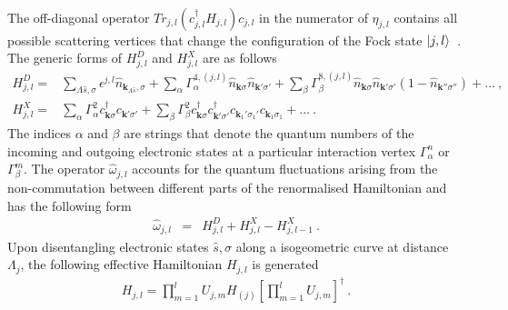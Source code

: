 \documentclass[reprint,onecolumn,prb,superscriptaddress]{revtex4-2}
\begin{document}
{\begin{eqnarray}
\end{eqnarray}
The off-diagonal operator \(Tr_{j,l}(c^{\dagger}_{j,l}H_{j,l})c_{j,l}\) in the numerator of \(\eta_{j,l}\) contains all possible scattering vertices that  change the configuration of the Fock state \(\ket{j,l}\)~\cite{anirbanurg1}. The generic forms of $H^{D}_{j,l}$ and $H^{X}_{j,l}$ are as follows
\begin{equation}\begin{aligned}
H^{D}_{j,l}=&\sum_{\Lambda\hat{s},\sigma}\epsilon^{j,l}\hat{n}_{\mathbf{k}_{\Lambda\hat{s}},\sigma}+\sum_{\alpha}\Gamma_{\alpha}^{4,(j,l)}\hat{n}_{\mathbf{k}\sigma}\hat{n}_{\mathbf{k}'\sigma'} +\sum_{\beta}\Gamma_{\beta}^{8,(j,l)}\hat{n}_{\mathbf{k}\sigma}\hat{n}_{\mathbf{k}'\sigma'}(1-\hat{n}_{\mathbf{k}''\sigma''})+\ldots~,\\
H^{X}_{j,l}=&\sum_{\alpha}\Gamma_{\alpha}^{2}c^{\dagger}_{\mathbf{k}\sigma}c_{\mathbf{k}'\sigma'}+\sum_{\beta}\Gamma_{\beta}^{2}c^{\dagger}_{\mathbf{k}\sigma}c^{\dagger}_{\mathbf{k}'\sigma'}c_{\mathbf{k}_{1}'\sigma_{1}'}c_{\mathbf{k}_{1}\sigma_{1}}+\ldots~.
\end{aligned}\end{equation}
The indices \(\alpha\) and \(\beta\) are strings that denote the quantum numbers of the incoming and outgoing electronic states at a particular interaction vertex \(\Gamma^n_{\alpha}\) or  \(\Gamma^m_{\beta}\). The operator $\hat{\omega}_{j,l}$ accounts for the quantum fluctuations arising from the non-commutation between different parts of the renormalised Hamiltonian and has the following form~\cite{anirbanurg1}
\begin{eqnarray}
\hat{\omega}_{j,l}&=&H^{D}_{j,l}+H^{X}_{j,l}-H^{X}_{j,l-1}~.\label{qfOp}
\end{eqnarray}
Upon disentangling electronic states $\hat{s},\sigma$ along a isogeometric curve at distance $\Lambda_{j}$, the following effective Hamiltonian $H_{j,l}$ is generated 
\begin{eqnarray}
H_{j,l}=\prod_{m=1}^{l}U_{j,m}H_{(j)}[\prod_{m=1}^{l}U_{j,m}]^{\dagger}~.
\end{eqnarray}

}
\end{document}
